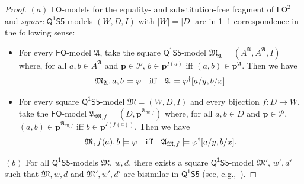 \documentclass[10pt,a4paper]{amsart}
\theoremstyle{plain}
\theoremstyle{definition}
\newcommand{\FO}{\ensuremath{\mathsf{FO}}}
\newcommand{\FOT}{\ensuremath{\mathsf{FO^2}}}
\newcommand{\FOMS}{\ensuremath{\mathsf{Q^1S5}}}
\newcommand{\bs}{\boldsymbol{\beta}}
\newcommand{\fform}[1]{\boldsymbol{#1}}
\newcommand{\pvar}{\fform{p}}
\newcommand{\varset}{\mathcal{P}}
\begin{document}
\begin{appendix}
\begin{proof}
$(a)$ \FO-models for the
equality- and substitution-free fragment of \FOT{} and \emph{square} \FOMS-models $(W,D,I)$ with $|W|=|D|$ are in 1--1 correspondence in the following sense:
%
\begin{itemize}
\item[--]
 For every \FO-model $\mathfrak A$, take the square
 \FOMS-model $\mathfrak M_\mathfrak A=(A^\mathfrak A,A^\mathfrak A,I)$ where, for all $a,b\in A^\mathfrak A$ and $\pvar\in\varset$, $b\in\pvar^{I(a)}$ iff $(a,b)\in\pvar^\mathfrak A$. 
 Then we have
 \[
\mbox{$\mathfrak M_\mathfrak A,a,b\models\varphi$\quad iff\quad $\mathfrak A\models\varphi^\dag[a/y,b/x]$.}
\]
 
 \item[--]
 For every square \FOMS-model $\mathfrak M=(W,D,I)$ and every bijection $f\colon D\to W$, take
 the \FO-model $\mathfrak A_{\mathfrak M,f}=(D,\pvar^{\mathfrak A_{\mathfrak M,f}})$ where, for all $a,b\in D$ and $\pvar\in\varset$, $(a,b)\in\pvar^{\mathfrak A_{\mathfrak M,f}}$ iff $b\in\pvar^{I(f(a))}$.
 Then we have
 \begin{equation}
 \label{sqm}
 \mbox{$\mathfrak M,f(a),b\models\varphi$\quad iff\quad $\mathfrak A_{\mathfrak M,f}\models\varphi^\dag[a/y,b/x]$.}
\end{equation}
%
\end{itemize}

$(b)$ For all \FOMS-models $\mathfrak M$, $w,d$, there exists a square
\FOMS-model $\mathfrak M'$, $w',d'$  such that 
$\mathfrak M,w,d$ and $\mathfrak M',w',d'$ are bisimilar in \FOMS{}
(see, e.g.,~\cite[Prop.3.12]{GabEtAl03}).
%
\end{proof}


\end{appendix}
\end{document}
